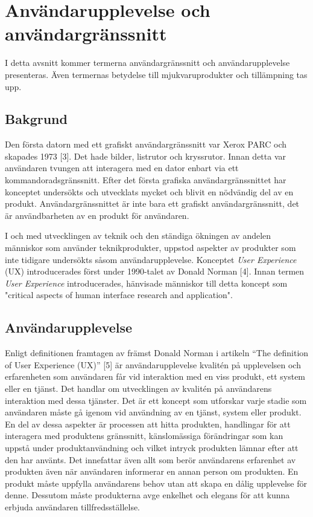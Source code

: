 \documentclass[12pt]{kththesis}
\begin{document}
\section{Användarupplevelse och användargränssnitt} 
I detta avsnitt kommer termerna användargränssnitt och användarupplevelse presenteras. Även termernas betydelse till mjukvaruprodukter och tillämpning tas upp.

\subsection{Bakgrund} 

Den första datorn med ett grafiskt användargränssnitt var Xerox PARC och skapades 1973 [3]. Det hade bilder, listrutor och kryssrutor. Innan detta var användaren tvungen att interagera med en dator enbart via ett kommandoradsgränssnitt. Efter det första grafiska användargränssnittet har konceptet undersökts och utvecklats mycket och blivit en nödvändig del av en produkt. Användargränssnittet är inte bara ett grafiskt användargränssnitt, det är användbarheten av en produkt för användaren.

I och med utvecklingen av teknik och den ständiga ökningen av andelen människor som använder teknikprodukter, uppstod aspekter av produkter som inte tidigare undersökts såsom användarupplevelse. Konceptet \textit{User Experience} (UX) introducerades först under 1990-talet av Donald Norman [4]. Innan termen \textit{User Experience} introducerades, hänvisade människor till detta koncept som "critical aspects of human interface research and application".

\subsection{Användarupplevelse}
 
Enligt definitionen framtagen av främst Donald Norman i artikeln “The definition of User Experience (UX)” [5] är användarupplevelse kvalitén på upplevelsen och erfarenheten som användaren får vid interaktion med en viss produkt, ett system eller en tjänst. Det handlar om utvecklingen av kvalitén på användarens interaktion med dessa tjänster. Det är ett koncept som utforskar varje stadie som användaren måste gå igenom vid användning av en tjänst, system eller produkt. En del av dessa aspekter är processen att hitta produkten, handlingar för att interagera med produktens gränssnitt, känslomässiga förändringar som kan uppstå under produktanvändning och vilket intryck produkten lämnar efter att den har använts. Det innefattar även allt som berör användarens erfarenhet av produkten även när användaren informerar en annan person om produkten. En produkt måste uppfylla användarens behov utan att skapa en dålig upplevelse för denne. Dessutom måste produkterna avge enkelhet och elegans för att kunna erbjuda användaren tillfredsställelse. 
\end{document}
